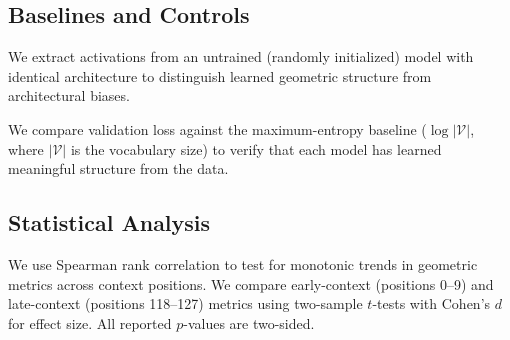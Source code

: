 \subsection{Baselines and Controls}
\label{sec:baselines}

We extract activations from an untrained (randomly initialized) model with identical architecture to distinguish learned geometric structure from architectural biases.

We compare validation loss against the maximum-entropy baseline ($\log |\mathcal{V}|$, where $|\mathcal{V}|$ is the vocabulary size) to verify that each model has learned meaningful structure from the data.

\subsection{Statistical Analysis}
\label{sec:stats}

We use Spearman rank correlation to test for monotonic trends in geometric metrics across context positions. We compare early-context (positions 0--9) and late-context (positions 118--127) metrics using two-sample $t$-tests with Cohen's $d$ for effect size. All reported $p$-values are two-sided.
